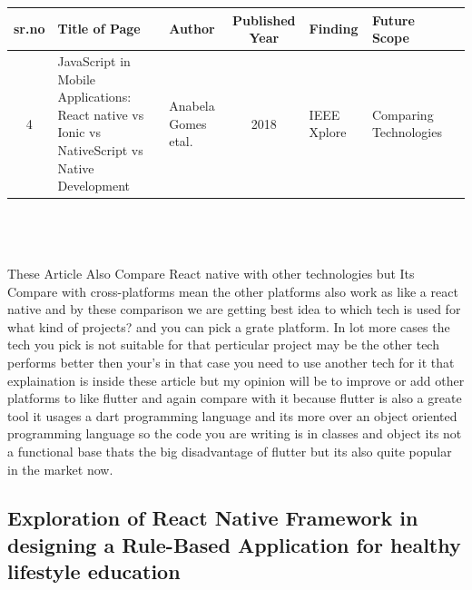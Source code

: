 \documentclass[12pt,a4paper]{article}
\begin{document}
\begin{tabular}{ |c | m{2.5cm} | m{2cm}| c | m{2cm} | m{2cm} | c | }

  \hline
  sr.no & Title of Page & Author & Published Year & Finding & Future Scope  \\ 
  \hline
 4 &  JavaScript in Mobile Applications: React native vs Ionic vs NativeScript vs Native Development & Anabela Gomes etal. &  2018 & IEEE Xplore & Comparing Technologies \\
\hline 
  
\end{tabular}
\\
\\
\\
These Article Also Compare React native with other technologies but Its Compare with cross-platforms mean the other platforms also work as like a react native and by these comparison we are getting best idea to which tech is used for what kind of projects? and you can pick a grate platform. In lot more cases the tech you pick is not suitable for that perticular project may be the other tech performs better then your's in that case you need to use another tech for it that explaination is inside these article but my opinion will be to improve or add other platforms to like flutter and again compare with it because flutter is also a greate tool it usages a dart programming language and its more over an object oriented programming language  so the code you are writing is in classes and object its not a functional base thats the big disadvantage of flutter but its also quite popular in the market now.

\newpage
\subsection*{Exploration of React Native Framework in designing a Rule-Based Application for healthy lifestyle education}
\end{document}
